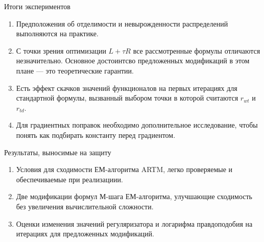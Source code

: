 \documentclass[utf8]{beamer}
\begin{document}
\begin{frame}{Итоги экспериментов}
\begin{enumerate}
\item Предположения об отделимости и невырожденности распределений выполняются на практике.
\item С точки зрения оптимизации $L + \tau R$ все рассмотренные формулы отличаются незначительно. Основное достоинтсво предложенных модификаций в этом плане --- это теоретические гарантии.
\item Есть эффект скачков значений функционалов на первых итерациях для стандартной формулы, вызванный выбором точки в которой считаются $r_{wt}$ и $r_{td}$.
\item Для градиентных поправок необходимо дополнительное исследование, чтобы понять как подбирать константу перед градиентом.
\end{enumerate}
\end{frame}

\begin{frame}{Результаты, выносимые на защиту}
\begin{enumerate}
\item Условия для сходимости ЕМ-алгоритма ARTM, легко проверяемые и обеспечиваемые при реализациии.
\item Две модификации формул М-шага ЕМ-алгоритма, улучшающие сходимость без увеличения вычислительной сложности.
\item Оценки изменения значений регуляризатора и логарифма правдоподобия на итерациях для предложенных модификаций.
\end{enumerate}
\end{frame}
\end{document}
